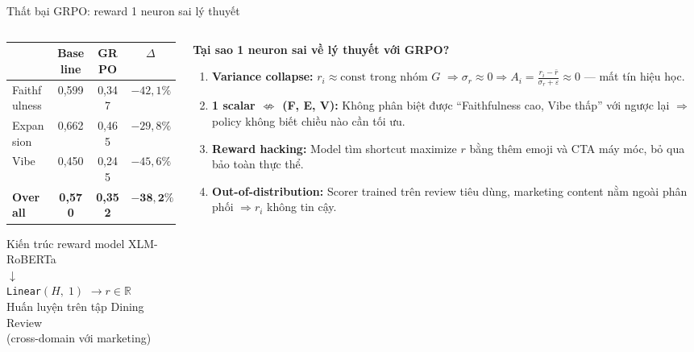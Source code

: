 \begin{frame}[t]{Thất bại GRPO: reward 1 neuron sai lý thuyết}
  \begin{columns}[T,onlytextwidth]
    \begin{column}{0.42\textwidth}
      \centering\scriptsize
      \begin{tabular}{@{}lccc@{}}
        \toprule
        & Baseline & GRPO & $\Delta$ \\
        \midrule
        Faithfulness & 0,599 & 0,347 & $-42{,}1\%$ \\
        Expansion    & 0,662 & 0,465 & $-29{,}8\%$ \\
        Vibe         & 0,450 & 0,245 & $-45{,}6\%$ \\
        \textbf{Overall} & \textbf{0,570} & \textbf{0,352} & $\mathbf{-38{,}2\%}$ \\
        \bottomrule
      \end{tabular}

      \vspace{0.5em}
      \begin{block}{Kiến trúc reward model}
        \scriptsize
        XLM-RoBERTa\\[0.2em]
        $\downarrow$\\[0.2em]
        \texttt{Linear}$(H,\;1)$ $\to r \in \mathbb{R}$\\[0.3em]
        Huấn luyện trên tập Dining Review\\
        (cross-domain với marketing)
      \end{block}
    \end{column}

    \begin{column}{0.56\textwidth}
      \scriptsize
      \textbf{Tại sao 1 neuron sai về lý thuyết với GRPO?}
      \vspace{0.3em}
      \begin{enumerate}\setlength\itemsep{4pt}
        \item \textbf{Variance collapse:}
          $r_i \approx \text{const}$ trong nhóm $G$
          $\Rightarrow \sigma_r \approx 0
          \Rightarrow A_i = \frac{r_i-\bar{r}}{\sigma_r+\varepsilon} \approx 0$
          --- mất tín hiệu học.

        \item \textbf{1 scalar $\not\Leftrightarrow$ (F, E, V):}
          Không phân biệt được ``Faithfulness cao, Vibe thấp'' với ngược lại
          $\Rightarrow$ policy không biết chiều nào cần tối ưu.

        \item \textbf{Reward hacking:}
          Model tìm shortcut maximize $r$ bằng thêm emoji và CTA máy móc,
          bỏ qua bảo toàn thực thể.

        \item \textbf{Out-of-distribution:}
          Scorer trained trên review tiêu dùng, marketing content nằm ngoài
          phân phối $\Rightarrow r_i$ không tin cậy.
      \end{enumerate}
    \end{column}
  \end{columns}
\end{frame}
